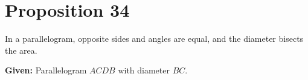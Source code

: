 
\section*{Proposition 34}

\begin{thm}
In a parallelogram, opposite sides and angles are equal, and the diameter bisects the area.
\end{thm}

\begin{figure}[H]
	\caption{}
\end{figure}

\textbf{Given:} Parallelogram $ACDB$ with diameter $BC$.

